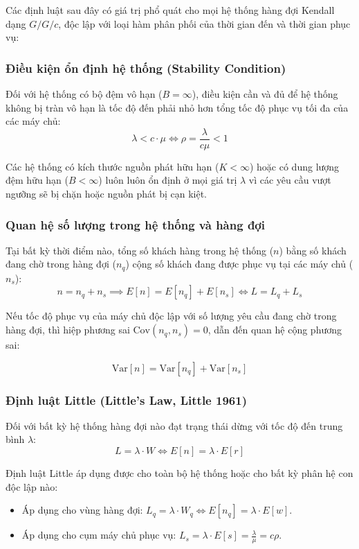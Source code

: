 \hspace{0.5cm}Các định luật sau đây có giá trị phổ quát cho mọi hệ thống hàng đợi Kendall dạng $G/G/c$, độc lập với loại hàm phân phối của thời gian đến và thời gian phục vụ:

\subsubsection{Điều kiện ổn định hệ thống (Stability Condition)}
Đối với hệ thống có bộ đệm vô hạn ($B = \infty$), điều kiện cần và đủ để hệ thống không bị tràn vô hạn là tốc độ đến phải nhỏ hơn tổng tốc độ phục vụ tối đa của các máy chủ:
\begin{equation}
    \lambda < c \cdot \mu \iff \rho = \frac{\lambda}{c\mu} < 1
\end{equation}

Các hệ thống có kích thước nguồn phát hữu hạn ($K < \infty$) hoặc có dung lượng đệm hữu hạn ($B < \infty$) luôn luôn ổn định ở mọi giá trị $\lambda$ vì các yêu cầu vượt ngưỡng sẽ bị chặn hoặc nguồn phát bị cạn kiệt.

\subsubsection{Quan hệ số lượng trong hệ thống và hàng đợi}
\hspace{0.5cm}Tại bất kỳ thời điểm nào, tổng số khách hàng trong hệ thống ($n$) bằng số khách đang chờ trong hàng đợi ($n_q$) cộng số khách đang được phục vụ tại các máy chủ ($n_s$):
\begin{equation}
    n = n_q + n_s \implies E[n] = E[n_q] + E[n_s] \iff L = L_q + L_s
\end{equation}

Nếu tốc độ phục vụ của máy chủ độc lập với số lượng yêu cầu đang chờ trong hàng đợi, thì hiệp phương sai $\text{Cov}(n_q, n_s) = 0$, dẫn đến quan hệ cộng phương sai:

\begin{equation}
    \text{Var}[n] = \text{Var}[n_q] + \text{Var}[n_s]
\end{equation}

\subsubsection{Định luật Little (Little's Law, Little 1961)}
\begin{theorempop}[title=\textbf{Định luật Little}]
Đối với bất kỳ hệ thống hàng đợi nào đạt trạng thái dừng với tốc độ đến trung bình $\lambda$:
\begin{equation}
    L = \lambda \cdot W \iff E[n] = \lambda \cdot E[r]
\end{equation}
\end{theorempop}
Định luật Little áp dụng được cho toàn bộ hệ thống hoặc cho bất kỳ phân hệ con độc lập nào:
\begin{itemize}[leftmargin=1.5em]
    \item Áp dụng cho vùng hàng đợi: $L_q = \lambda \cdot W_q \iff E[n_q] = \lambda \cdot E[w]$.
    \item Áp dụng cho cụm máy chủ phục vụ: $L_s = \lambda \cdot E[s] = \frac{\lambda}{\mu} = c\rho$.
\end{itemize}

